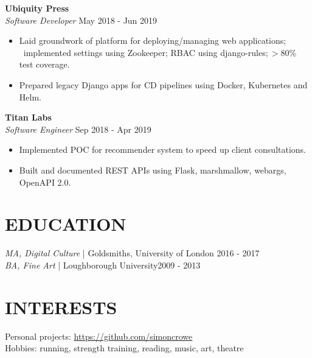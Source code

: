 \documentclass[line,margin]{res}
\begin{document}
\begin{resume}
                \textbf{Ubiquity Press} \\
                {\sl Software Developer} \hfill        May 2018 - Jun 2019 \\
                  \begin{itemize} \itemsep -2pt %
                  \item Laid groundwork of platform for deploying/managing web applications; \
                        implemented settings using Zookeeper; RBAC using django-rules$; > $80\% test coverage.
                  \item Prepared legacy Django apps for CD pipelines using Docker, Kubernetes and Helm. 
                  \end{itemize}
                
	        \textbf{Titan Labs} \\
                {\sl Software Engineer} \hfill         Sep 2018 - Apr 2019 \\
                  \begin{itemize} \itemsep -2pt %
                  \item Implemented POC for recommender system to speed up client consultations.
                  \item Built and documented REST APIs using Flask, marshmallow, webargs, OpenAPI 2.0.
                  \end{itemize}
 
 
\section{EDUCATION} {\sl MA, Digital Culture} | Goldsmiths, University of London \hfill 2016 - 2017 \\
                    {\sl BA, Fine Art} | Loughborough University\hfill 2009 - 2013
 
 
\section{INTERESTS} Personal projects: \url{https://github.com/simoncrowe} \\
                    Hobbies: running, strength training, reading, music, art, theatre
 

\end{resume}
\end{document}
